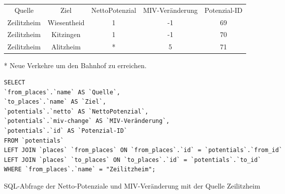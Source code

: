 \begin{tabular}{ c  c  c  c  c }
Quelle & Ziel & NettoPotenzial & MIV-Veränderung & Potenzial-ID\\ 
Zeilitzheim & Wiesentheid & 1 & -1 & 69\\ 
Zeilitzheim & Kitzingen & 1 & -1 & 70\\ 
Zeilitzheim & Alitzheim & * & 5 & 71\\ 
\end{tabular}    
\newline
\newline
* Neue Verkehre um den Bahnhof zu erreichen.
\newline
\begin{listing}[htbp]
\begin{verbatim}
SELECT
`from_places`.`name` AS `Quelle`, 
`to_places`.`name` AS `Ziel`, 
`potentials`.`netto` AS `NettoPotenzial`, 
`potentials`.`miv-change` AS `MIV-Veränderung`, 
`potentials`.`id` AS `Potenzial-ID`
FROM `potentials`
LEFT JOIN `places` `from_places` ON `from_places`.`id` = `potentials`.`from_id`
LEFT JOIN `places` `to_places` ON `to_places`.`id` = `potentials`.`to_id`
WHERE `from_places`.`name` = "Zeilitzheim";
\end{verbatim}
\caption{SQL-Abfrage der Netto-Potenziale und MIV-Veränderung mit der Quelle Zeilitzheim}\label{lst-fz-zeilitzheim}
\end{listing}